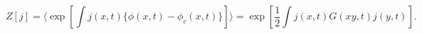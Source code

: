 \begin{equation}
Z[j] = \langle \exp[\int j(x,t) \{ \phi(x,t) - \phi_c(x,t) \} ] \rangle = \exp
[\frac{1}{2} \int j(x,t) G(xy,t) j(y,t)].
\end{equation}

